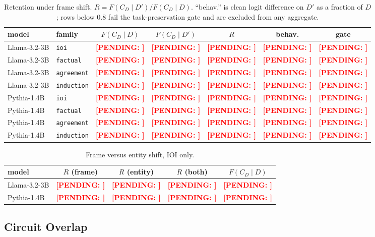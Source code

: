 \documentclass[11pt,a4paper]{article}
\newcounter{pendingcount}
\DeclareRobustCommand{\pending}[1]{\stepcounter{pendingcount}%
  \textcolor{red}{\textbf{[PENDING: #1]}}}
\newcommand{\FD}{F(C_D \!\mid\! D)}
\newcommand{\FDp}{F(C_D \!\mid\! D')}
\begin{document}
\begin{table}[H]
  \centering
  \caption{Retention under frame shift. $R = \FDp/\FD$. ``behav.'' is clean logit
    difference on $D'$ as a fraction of $D$; rows below $0.8$ fail the
    task-preservation gate and are excluded from any aggregate.}
  \label{tab:frame}
  \smallskip
  \begin{tabular}{llccccc}
    \toprule
    model & family & $\FD$ & $\FDp$ & $R$ & behav. & gate \\
    \midrule
    Llama-3.2-3B & \texttt{ioi}       & \pending{} & \pending{} & \pending{} & \pending{} & \pending{} \\
    Llama-3.2-3B & \texttt{factual}   & \pending{} & \pending{} & \pending{} & \pending{} & \pending{} \\
    Llama-3.2-3B & \texttt{agreement} & \pending{} & \pending{} & \pending{} & \pending{} & \pending{} \\
    Llama-3.2-3B & \texttt{induction} & \pending{} & \pending{} & \pending{} & \pending{} & \pending{} \\
    \midrule
    Pythia-1.4B  & \texttt{ioi}       & \pending{} & \pending{} & \pending{} & \pending{} & \pending{} \\
    Pythia-1.4B  & \texttt{factual}   & \pending{} & \pending{} & \pending{} & \pending{} & \pending{} \\
    Pythia-1.4B  & \texttt{agreement} & \pending{} & \pending{} & \pending{} & \pending{} & \pending{} \\
    Pythia-1.4B  & \texttt{induction} & \pending{} & \pending{} & \pending{} & \pending{} & \pending{} \\
    \bottomrule
  \end{tabular}
\end{table}

\begin{table}[H]
  \centering
  \caption{Frame versus entity shift, IOI only.}
  \label{tab:axes}
  \smallskip
  \begin{tabular}{lcccc}
    \toprule
    model & $R$ (frame) & $R$ (entity) & $R$ (both) & $\FD$ \\
    \midrule
    Llama-3.2-3B & \pending{} & \pending{} & \pending{} & \pending{} \\
    Pythia-1.4B  & \pending{} & \pending{} & \pending{} & \pending{} \\
    \bottomrule
  \end{tabular}
\end{table}

\subsection{Circuit Overlap}
\end{document}

